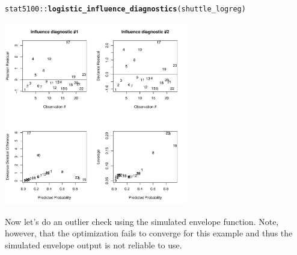\documentclass{article}\usepackage[]{graphicx}\usepackage[]{color}
\makeatletter
\newcommand{\hlopt}[1]{\textcolor[rgb]{0,0,0}{#1}}%
\newcommand{\hlstd}[1]{\textcolor[rgb]{0.345,0.345,0.345}{#1}}%
\newcommand{\hlkwd}[1]{\textcolor[rgb]{0.737,0.353,0.396}{\textbf{#1}}}%
\newenvironment{kframe}{%
 \def\at@end@of@kframe{}%
 \ifinner\ifhmode%
  \def\at@end@of@kframe{\end{minipage}}%
  \begin{minipage}{\columnwidth}%
 \fi\fi%
 \def\FrameCommand##1{\hskip\@totalleftmargin \hskip-\fboxsep
 \colorbox{shadecolor}{##1}\hskip-\fboxsep
     \hskip-\linewidth \hskip-\@totalleftmargin \hskip\columnwidth}%
 \MakeFramed {\advance\hsize-\width
   \@totalleftmargin\z@ \linewidth\hsize
   \@setminipage}}%
 {\par\unskip\endMakeFramed%
 \at@end@of@kframe}
\newenvironment{knitrout}{}{} %
\makeatother
\begin{document}
\begin{knitrout}
\color{fgcolor}\begin{kframe}
\begin{alltt}
\hlstd{stat5100}\hlopt{::}\hlkwd{logistic_influence_diagnostics}\hlstd{(shuttle_logreg)}
\end{alltt}
\end{kframe}

{\centering \includegraphics[width=0.6\textwidth]{figure/unnamed-chunk-5-1} 

}



\end{knitrout}

Now let's do an outlier check using the simulated envelope function. Note, however, that the optimization fails to converge for this example and thus the simulated envelope output is not reliable to use. 
\end{document}

